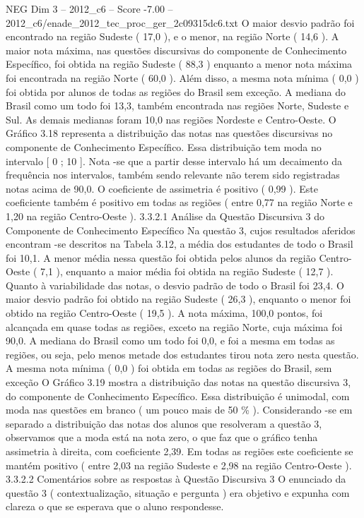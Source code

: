 \begin{textsample}{NEG Dim 3 – 2012\_c6 – Score -7.00 – 2012\_c6/enade\_2012\_tec\_proc\_ger\_2c09315dc6.txt}
O maior desvio padrão foi encontrado na região Sudeste ( 17,0 ), e o menor, na região Norte ( 14,6 ).
A maior nota máxima, nas questões discursivas do componente de Conhecimento Específico, foi obtida na região Sudeste ( 88,3 ) enquanto a menor nota máxima foi encontrada na região Norte ( 60,0 ).
Além disso, a mesma nota mínima ( 0,0 ) foi obtida por alunos de todas as regiões do Brasil sem exceção.
A mediana do Brasil como um todo foi 13,3, também encontrada nas regiões Norte, Sudeste e Sul.
As demais medianas foram 10,0 nas regiões Nordeste e Centro-Oeste.
O Gráfico 3.18 representa a distribuição das notas nas questões discursivas no componente de Conhecimento Específico.
Essa distribuição tem moda no intervalo [ 0 ; 10 ].
Nota -se que a partir desse intervalo há um decaimento da frequência nos intervalos, também sendo relevante não terem sido registradas notas acima de 90,0.
O coeficiente de assimetria é positivo ( 0,99 ).
Este coeficiente também é positivo em todas as regiões ( entre 0,77 na região Norte e 1,20 na região Centro-Oeste ). 3.3.2.1 Análise da Questão Discursiva 3 do Componente de Conhecimento Específico Na questão 3, cujos resultados aferidos encontram -se descritos na Tabela 3.12, a média dos estudantes de todo o Brasil foi 10,1.
A menor média nessa questão foi obtida pelos alunos da região Centro-Oeste ( 7,1 ), enquanto a maior média foi obtida na região Sudeste ( 12,7 ).
Quanto à variabilidade das notas, o desvio padrão de todo o Brasil foi 23,4.
O maior desvio padrão foi obtido na região Sudeste ( 26,3 ), enquanto o menor foi obtido na região Centro-Oeste ( 19,5 ).
A nota máxima, 100,0 pontos, foi alcançada em quase todas as regiões, exceto na região Norte, cuja máxima foi 90,0.
A mediana do Brasil como um todo foi 0,0, e foi a mesma em todas as regiões, ou seja, pelo menos metade dos estudantes tirou nota zero nesta questão.
A mesma nota mínima ( 0,0 ) foi obtida em todas as regiões do Brasil, sem exceção O Gráfico 3.19 mostra a distribuição das notas na questão discursiva 3, do componente de Conhecimento Específico.
Essa distribuição é unimodal, com moda nas questões em branco ( um pouco mais de 50 \% ).
Considerando -se em separado a distribuição das notas dos alunos que resolveram a questão 3, observamos que a moda está na nota zero, o que faz que o gráfico tenha assimetria à direita, com coeficiente 2,39.
Em todas as regiões este coeficiente se mantém positivo ( entre 2,03 na região Sudeste e 2,98 na região Centro-Oeste ). 3.3.2.2 Comentários sobre as respostas à Questão Discursiva 3 O enunciado da questão 3 ( contextualização, situação e pergunta ) era objetivo e expunha com clareza o que se esperava que o aluno respondesse.

\end{textsample}
